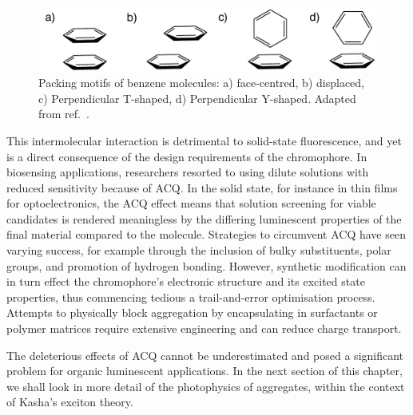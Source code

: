 \begin{figure}[H]
\centering
  \includegraphics[width=0.7\linewidth]{Intro/Stacking.pdf}
  \caption[Benzene Stacking Motifs]{Packing motifs of benzene molecules: a) face-centred, b) displaced, c) Perpendicular T-shaped, d) Perpendicular Y-shaped. Adapted from ref.~.}
  \label{figure: Benzene_Stacking}
\end{figure}

This intermolecular interaction is detrimental to solid-state fluorescence, and yet is a direct consequence of the design requirements of the chromophore. In biosensing applications, researchers resorted to using dilute solutions with reduced sensitivity because of ACQ.\cite{Thomas2007,Kwok2015} In the solid state, for instance in thin films for optoelectronics, the ACQ effect means that solution screening for viable candidates is rendered meaningless by the differing luminescent properties of the final material compared to the molecule. Strategies to circumvent ACQ have seen varying success, for example through the inclusion of bulky substituents, polar groups, and promotion of hydrogen bonding.\cite{Hong2009,Zhang2013,Mei2014,Mei2015} However, synthetic modification can in turn effect the chromophore's electronic structure and its excited state properties, thus commencing tedious a trail-and-error optimisation process. Attempts to physically block aggregation by encapsulating in surfactants or polymer matrices require extensive engineering and can reduce charge transport.\cite{Hong2009,Chen2000,Lee2013} 

The deleterious effects of ACQ cannot be underestimated and posed a significant problem for organic luminescent applications. In the next section of this chapter, we shall look in more detail of the photophysics of aggregates, within the context of Kasha's exciton theory.
